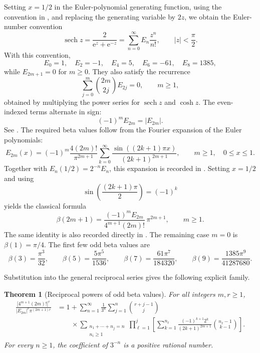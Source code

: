 \documentclass[11pt,reqno]{amsart}
\numberwithin{equation}{section}
\newtheorem{theorem}{Theorem}[section]
\theoremstyle{definition}
\theoremstyle{remark}
\newcommand{\e}{\mathrm{e}}
\begin{document}
Setting \(x=1/2\) in the Euler-polynomial generating function, using
the convention in
\cite[Eqs.~(23.1.1)--(23.1.3), p.~804]{AbramowitzStegun1964},
and replacing the generating variable by \(2z\), we obtain the
Euler-number convention
\begin{equation}\label{eq:euler-number-convention}
 \operatorname{sech}z
 =
 \frac{2}{\e^z+\e^{-z}}
 =
 \sum_{n=0}^{\infty}E_n\frac{z^n}{n!},
 \qquad |z|<\frac{\pi}{2}.
\end{equation}
With this convention,
\[
 E_0=1,\quad E_2=-1,\quad E_4=5,\quad E_6=-61,\quad
 E_8=1385,
\]
while \(E_{2m+1}=0\) for \(m\geq0\).  They also satisfy the recurrence
\begin{equation}\label{eq:euler-number-recurrence}
 \sum_{j=0}^{m}\binom{2m}{2j}E_{2j}=0,
 \qquad m\geq1,
\end{equation}
obtained by multiplying the power series for
\(\operatorname{sech}z\) and \(\cosh z\).  The even-indexed terms
alternate in sign:
\[
 (-1)^mE_{2m}=|E_{2m}|.
\]
See \cite[Eq.~(23.1.15), p.~805]{AbramowitzStegun1964}.
The required beta values follow from the Fourier expansion of the Euler
polynomials:
\[
 E_{2m}(x)
 =
 (-1)^m\frac{4(2m)!}{\pi^{2m+1}}
 \sum_{k=0}^{\infty}
 \frac{\sin((2k+1)\pi x)}{(2k+1)^{2m+1}},
 \qquad m\geq1,\quad 0\leq x\leq1.
\]
Together with
\(E_n(1/2)=2^{-n}E_n\), this expansion is recorded in
\cite[Eqs.~(23.1.18) and (23.1.21), p.~805]{AbramowitzStegun1964}.  Setting
\(x=1/2\) and using
\[
 \sin\left(\frac{(2k+1)\pi}{2}\right)=(-1)^k
\]
yields the classical formula
\begin{equation}\label{eq:odd-beta}
 \beta(2m+1)
 =
 \frac{(-1)^mE_{2m}}{4^{m+1}(2m)!}\,
 \pi^{2m+1},
 \qquad m\geq1.
\end{equation}
The same identity is also recorded directly in
\cite[Eq.~(23.2.22), p.~807]{AbramowitzStegun1964}.  The remaining case
\(m=0\) is
\(
 \beta(1)=\pi/4.
\)
The first few odd beta values are
\begin{equation}\label{eq:first-odd-beta-values}
 \beta(3)=\frac{\pi^3}{32},\qquad
 \beta(5)=\frac{5\pi^5}{1536},\qquad
 \beta(7)=\frac{61\pi^7}{184320},\qquad
 \beta(9)=\frac{1385\pi^9}{41287680}.
\end{equation}

Substitution into the general reciprocal series gives the following
explicit family.

\begin{theorem}[Reciprocal powers of odd beta values]
\label{thm:odd-beta-powers}
For all integers \(m,r\geq1\),
\begin{equation}\label{eq:pi-family}
\begin{aligned}
 \frac{\bigl[4^{m+1}(2m)!\bigr]^r}
 {|E_{2m}|^r\pi^{(2m+1)r}}
 &=
 1+\sum_{n=1}^{\infty}\frac1{3^n}
 \sum_{j=1}^{n}\binom{r+j-1}{j}\\
 &\qquad {}\times
 \sum_{\substack{n_1+\cdots+n_j=n\\n_i\geq1}}
 \prod_{\ell=1}^{j}
 \left[
 \sum_{k=1}^{n_\ell}
 \frac{(-1)^{k+1}2^k}{(2k+1)^{2m+1}}
 \binom{n_\ell-1}{k-1}
 \right].
\end{aligned}
\end{equation}
For every \(n\geq1\), the coefficient of \(3^{-n}\) is a positive
rational number.
\end{theorem}
\end{document}
